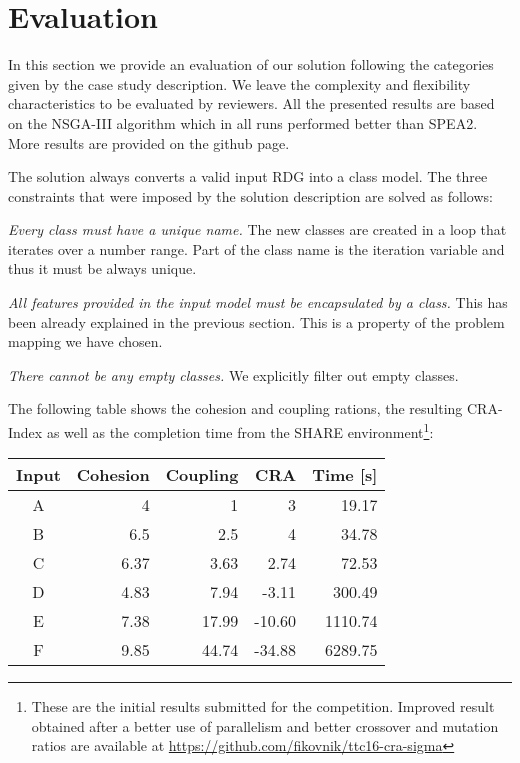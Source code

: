 
\section{Evaluation}
\label{sec:Evaluation}
\enlargethispage{10mm}

In this section we provide an evaluation of our solution following the categories given by the case study description.
We leave the complexity and flexibility characteristics to be evaluated by reviewers.
All the presented results are based on the NSGA-III algorithm which in all runs performed better than SPEA2. 
More results are provided on the github page.

The solution always converts a valid input RDG into a class model.
The three constraints that were imposed by the solution description are solved as follows:
%
\begin{compactitem}[---]
  \item \emph{Every class must have a unique name.} 
  The new classes are created in a loop that iterates over a number range.
  Part of the class name is the iteration variable and thus it must be always unique.
  \item \emph{All features provided in the input model must be encapsulated by a class.} 
  This has been already explained in the previous section.
  This is a property of the problem mapping we have chosen.
  \item \emph{There cannot be any empty classes.}
  We explicitly filter out empty classes.
\end{compactitem}

The following table shows the cohesion and coupling rations, the resulting CRA-Index as well as the completion time from the SHARE environment\footnote{These are the initial results submitted for the competition. Improved result obtained after a better use of parallelism and better crossover and mutation ratios are available at \url{https://github.com/fikovnik/ttc16-cra-sigma}}:
\begin{center}
\begin{tabular}{crrrr}
\hline
\textbf{Input} & \textbf{Cohesion} & \textbf{Coupling} & \textbf{CRA} & \textbf{Time {[}s{]}} \\ \hline
A           & 4        & 1        & 3       & 19.17    \\
B           & 6.5      & 2.5      & 4       & 34.78    \\
C           & 6.37     & 3.63     & 2.74    & 72.53    \\
D           & 4.83     & 7.94     & -3.11   & 300.49   \\
E           & 7.38     & 17.99    & -10.60  & 1110.74  \\
F           & 9.85     & 44.74    & -34.88  & 6289.75  \\ \hline
\end{tabular}
\end{center}
